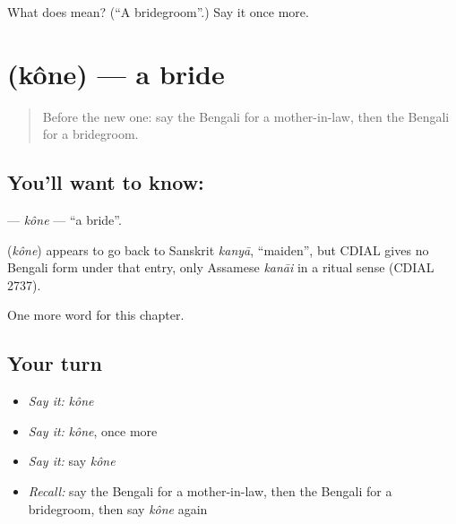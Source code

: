 \begin{tcolorbox}[breakable,colback=teal!4,colframe=teal!35!black,title={Before you move on}]
What does  mean? (\textquotedblleft{}A bridegroom\textquotedblright{}.) Say it once more.
\end{tcolorbox}
\section[\texorpdfstring{\bn{কনে} (kône)}{কনে (kône)}]{ (kône) — a bride}

\label{lesson:BN-C168-kone}



\begin{quote}
Before the new one: say the Bengali for a mother-in-law, then the Bengali for a bridegroom.
\end{quote}

\subsection*{You'll want to know: }
\textbf{} — \emph{kône} — \textquotedblleft{}a bride\textquotedblright{}.

\begin{cousinweb}
\textbf{} (\emph{kône}) appears to go back to Sanskrit \emph{kanyā}, \textquotedblleft{}maiden\textquotedblright{}, but CDIAL gives no Bengali form under that entry, only Assamese \emph{kanāi} in a ritual sense (CDIAL 2737).
\end{cousinweb}

\begin{grammarlens}[title={What you've built}]
One more word for this chapter.
\end{grammarlens}

\subsection*{Your turn}
\begin{itemize}
\raggedright
  \item \emph{Say it:} \emph{kône}
  \item \emph{Say it:} \emph{kône}, once more
  \item \emph{Say it:} say \emph{kône}
  \item \emph{Recall:} say the Bengali for a mother-in-law, then the Bengali for a bridegroom, then say \emph{kône} again
\end{itemize}

